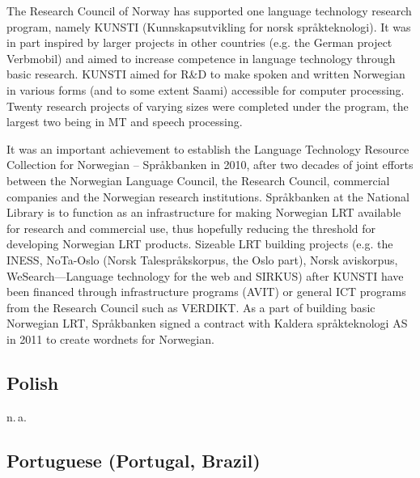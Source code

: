 \documentclass[10pt, plain]{../../metanetpaper}
\begin{document}
\begin{multicols}{2}
The Research Council of Norway has supported one language technology research program, namely KUNSTI (Kunnskapsutvikling for norsk språkteknologi). It was in part inspired by larger projects in other countries (e.g. the German project Verbmobil) and aimed to increase competence in language technology through basic research. KUNSTI aimed for R\&D to make spoken and written Norwegian in various forms (and to some extent Saami) accessible for computer processing. Twenty research projects of varying sizes were completed under the program, the largest two being in MT and speech processing.

It was an important achievement to establish the Language Technology Resource Collection for Norwegian – Språkbanken in 2010, after two decades of joint efforts between the Norwegian Language Council, the Research Council, commercial companies and the Norwegian research institutions. Språkbanken at the National Library is to function as an infrastructure for making Norwegian LRT available for research and commercial use, thus hopefully reducing the threshold for developing Norwegian LRT products. Sizeable LRT building projects (e.g. the INESS, NoTa-Oslo (Norsk Talespråkskorpus, the Oslo part), Norsk aviskorpus, WeSearch—Language technology for the web and SIRKUS) after KUNSTI have been financed through infrastructure programs (AVIT) or general ICT programs from the Research Council such as VERDIKT. As a part of building basic Norwegian LRT, Språkbanken signed a contract with Kaldera språkteknologi AS in 2011 to create wordnets for Norwegian.

\subsection*{Polish}
\label{sec:polish}

n.\,a.

\subsection*{Portuguese (Portugal, Brazil)}
\label{sec:port-port-braz}


\end{multicols}
\end{document}
